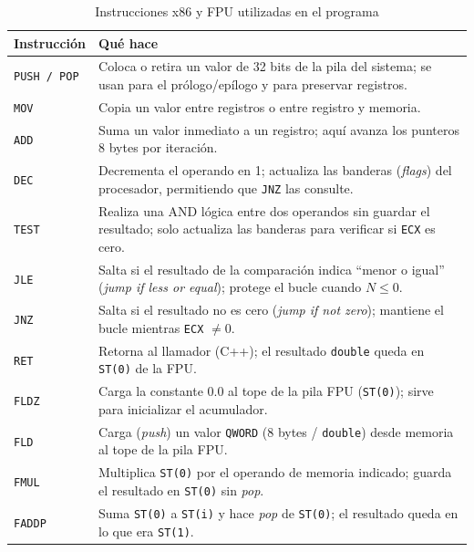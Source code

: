 \documentclass[12pt, letterpaper]{article}
\begin{document}
\begin{table}[H]
    \centering
    \begin{tabular}{@{}lp{9.5cm}@{}}
        \toprule
        \textbf{Instrucción} & \textbf{Qué hace} \\
        \midrule
        \texttt{PUSH / POP} & Coloca o retira un valor de 32 bits de la pila del sistema; se usan para el prólogo/epílogo y para preservar registros. \\
        \texttt{MOV}   & Copia un valor entre registros o entre registro y memoria. \\
        \texttt{ADD}   & Suma un valor inmediato a un registro; aquí avanza los punteros 8 bytes por iteración. \\
        \texttt{DEC}   & Decrementa el operando en 1; actualiza las banderas (\textit{flags}) del procesador, permitiendo que \texttt{JNZ} las consulte. \\
        \texttt{TEST}  & Realiza una AND lógica entre dos operandos sin guardar el resultado; solo actualiza las banderas para verificar si \texttt{ECX} es cero. \\
        \texttt{JLE}   & Salta si el resultado de la comparación indica ``menor o igual'' (\textit{jump if less or equal}); protege el bucle cuando $N \leq 0$. \\
        \texttt{JNZ}   & Salta si el resultado no es cero (\textit{jump if not zero}); mantiene el bucle mientras \texttt{ECX} $\neq 0$. \\
        \texttt{RET}   & Retorna al llamador (C++); el resultado \texttt{double} queda en \texttt{ST(0)} de la FPU. \\
        \texttt{FLDZ}  & Carga la constante 0.0 al tope de la pila FPU (\texttt{ST(0)}); sirve para inicializar el acumulador. \\
        \texttt{FLD}   & Carga (\textit{push}) un valor \texttt{QWORD} (8 bytes / \texttt{double}) desde memoria al tope de la pila FPU. \\
        \texttt{FMUL}  & Multiplica \texttt{ST(0)} por el operando de memoria indicado; guarda el resultado en \texttt{ST(0)} sin \textit{pop}. \\
        \texttt{FADDP} & Suma \texttt{ST(0)} a \texttt{ST(i)} y hace \textit{pop} de \texttt{ST(0)}; el resultado queda en lo que era \texttt{ST(1)}. \\
        \bottomrule
    \end{tabular}
    \caption{Instrucciones x86 y FPU utilizadas en el programa}
\end{table}
\end{document}
